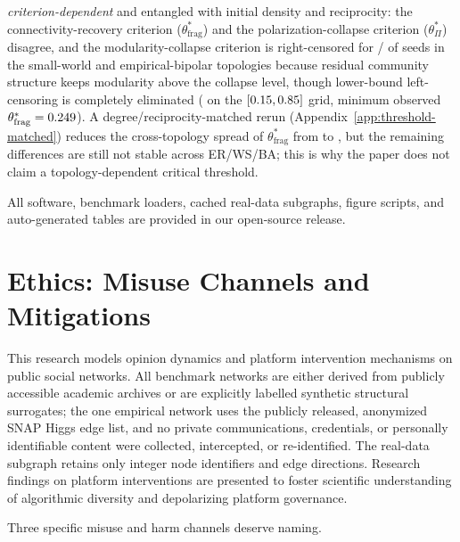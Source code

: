\begin{enumerate}
    \emph{criterion-dependent} and entangled with initial density and reciprocity: the
    connectivity-recovery criterion ($\theta^*_{\mathrm{frag}}$) and the
    polarization-collapse criterion ($\theta^*_{\Pi}$) disagree, and the modularity-collapse
    criterion is right-censored for
    \ThresholdQCensoredSmallWorld{}/\ThresholdQCensoredEmpiricalBipolar{} of
    \ThresholdSeeds{} seeds in the small-world and empirical-bipolar topologies because
    residual community structure keeps modularity above the collapse level, though
    lower-bound left-censoring is completely eliminated (\ThresholdFragLeftCensoredFrac{} on
    the $[0.15, 0.85]$ grid, minimum observed $\theta^*_{\mathrm{frag}}=0.249$).
    A degree/reciprocity-matched rerun (Appendix~\ref{app:threshold-matched}) reduces the
    cross-topology spread of $\theta^*_{\mathrm{frag}}$ from \ThresholdFragSpread{} to
    \MatchedFragSpread{}, but the remaining differences are still not stable across ER/WS/BA;
    this is why the paper does not claim a topology-dependent critical threshold.
\end{enumerate}

All software, benchmark loaders, cached real-data subgraphs, figure scripts, and
auto-generated tables are provided in our open-source release.

\section{Ethics: Misuse Channels and Mitigations}
\label{app:ethics}

This research models opinion dynamics and platform intervention mechanisms on public social
networks. All benchmark networks are either derived from publicly accessible academic
archives or are explicitly labelled synthetic structural surrogates; the one empirical
network uses the publicly released, anonymized SNAP Higgs edge list, and no private
communications, credentials, or personally identifiable content were collected,
intercepted, or re-identified. The real-data subgraph retains only integer node identifiers
and edge directions. Research findings on platform interventions are presented to foster
scientific understanding of algorithmic diversity and depolarizing platform governance.

Three specific misuse and harm channels deserve naming.

